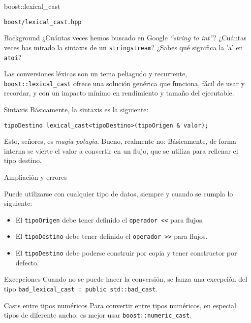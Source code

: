 \documentclass[8pt,xcolor=svgnames]{beamer}
\begin{document}
\begin{frame}[fragile]{boost::lexical\_cast}
  \begin{block}{}
    \texttt{boost/lexical\_cast.hpp}
  \end{block}
  \begin{block}{Background}
    ¿Cuántas veces hemos buscado en Google \textit{``string to int''}?
    ¿Cuántas veces has mirado la sintaxis de un \texttt{stringstream}?
    ¿Sabes qué significa la 'a' en \texttt{atoi}?

    \medskip

    Las conversiones léxicas son un tema peliagudo y recurrente,
    \texttt{boost::lexical\_cast} ofrece una solución genérica que
    funciona, fácil de usar y recordar, y con un impacto mínimo en
    rendimiento y tamaño del ejecutable.
  \end{block}
\pause
  \begin{block}{Sintaxis}
    Básicamente, la sintaxis es la siguiente:

\begin{verbatim}
tipoDestino lexical_cast<tipoDestino>(tipoOrigen & valor);
\end{verbatim}

    Esto, señores, es \textit{magia potagia}. Bueno, realmente no:
    Básicamente, de forma interna se vierte el valor a convertir en un
    flujo, que se utiliza para rellenar el tipo destino.
  \end{block}
\end{frame}

\begin{frame}{Ampliación y errores}
  \begin{block}{}
    Puede utilizarse con cualquier tipo de datos, siempre y cuando se cumpla lo siguiente:
    \begin{itemize}
    \item El \texttt{tipoOrigen} debe tener definido el \texttt{operador <<}
      para flujos.
    \item El \texttt{tipoDestino} debe tener definido el \texttt{operador >>}
      para flujos.
    \item El \texttt{tipoDestino} debe poderse construir por copia y tener
      constructor por defecto.
    \end{itemize}
  \end{block}

  \pause

  \begin{block}{Excepciones}
    Cuando no se puede hacer la conversión, se lanza una excepción del tipo \texttt{bad\_lexical\_cast : public std::bad\_cast}.
  \end{block}

  \pause

  \begin{block}{Casts entre tipos numéricos}
    Para convertir entre tipos numéricos, en especial tipos de
    diferente ancho, es mejor usar \texttt{boost::numeric\_cast}.
  \end{block}
\end{frame}
\end{document}
